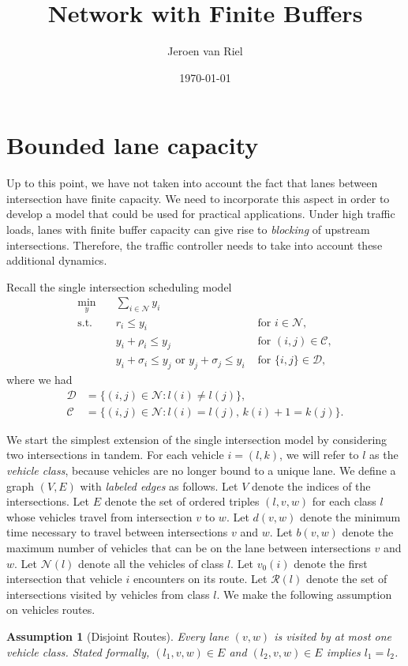 \documentclass{article}
\title{Network with Finite Buffers}
\author{Jeroen van Riel}
\date{\monthyeardate\today}
\theoremstyle{definition}
\theoremstyle{plain}
\newtheorem{assump}{Assumption}
\begin{document}
\section*{Bounded lane capacity}

Up to this point, we have not taken into account the fact that lanes between
intersection have finite capacity. We need to incorporate this aspect in order
to develop a model that could be used for practical applications. Under high
traffic loads, lanes with finite buffer capacity can give rise to
\textit{blocking} of upstream intersections. Therefore, the traffic controller
needs to take into account these additional dynamics.


Recall the single intersection scheduling model
\begin{align*}
  \min_{y} \quad & \sum_{i \in \mathcal{N}} y_{i} & \\
  \text{s.t.} \quad & r_{i} \leq y_{i} & \text{ for } i \in \mathcal{N} , \\
  & y_{i} + \rho_{i} \leq y_{j} & \text{ for } (i,j) \in \mathcal{C} , \\
  & y_{i} + \sigma_{i} \leq y_{j} \text{ or } y_{j} + \sigma_{j} \leq y_{i} & \text{ for } \{i,j\} \in \mathcal{D} ,
\end{align*}
where we had
\begin{align*}
  \mathcal{D} &= \{ (i,j) \in \mathcal{N} : l(i) \neq l(j) \} , \\
  \mathcal{C} &= \{ (i,j) \in \mathcal{N} : l(i) = l(j) , \, k(i) + 1 = k(j) \} .
\end{align*}

We start the simplest extension of the single intersection model by considering
two intersections in tandem.
For each vehicle $i = (l,k)$, we will refer to $l$ as the \textit{vehicle class}, because vehicles are no longer bound to a unique lane.
%
We define a graph $(V,E)$ with \textit{labeled edges} as follows.
Let $V$ denote the indices of the intersections.
Let $E$ denote the set of ordered triples $(l, v, w)$ for each class $l$ whose
vehicles travel from intersection $v$ to $w$.
%
Let $d(v, w)$ denote the minimum time necessary to travel between intersections $v$ and $w$.
Let $b(v, w)$ denote the maximum number of vehicles that can be on the lane between intersections $v$ and $w$.
Let $\mathcal{N}(l)$ denote all the vehicles of class $l$.
Let $v_{0}(i)$ denote the first intersection that vehicle $i$ encounters on its route.
Let $\mathcal{R}(l)$ denote the set of intersections visited by vehicles from class $l$.
%
We make the following assumption on vehicles routes.
\begin{assump}[Disjoint Routes]\label{assump1}
  Every lane $(v,w)$ is visited by at most one vehicle class. Stated formally,
  $(l_{1},v,w) \in E$ and $(l_{2},v,w) \in E$ implies $l_{1}=l_{2}$.
\end{assump}
\end{document}
